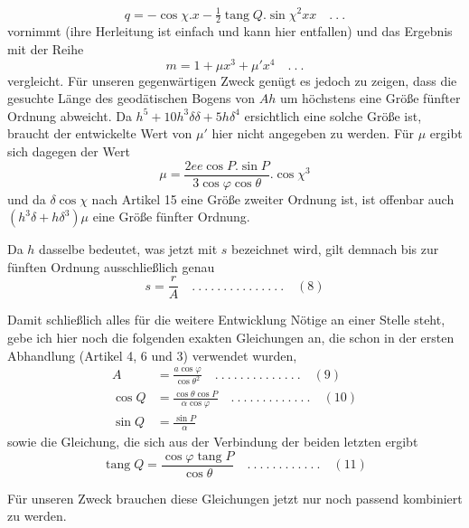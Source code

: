 \[
q=-\cos\chi\mathord{.}x-\tfrac12\operatorname{tang}Q\mathord{.}\sin\chi^2xx\quad .\ .\ .
\]
vornimmt (ihre Herleitung ist einfach und kann hier entfallen) und das Ergebnis mit der Reihe
\[
m=1+\mu x^3+\mu'x^4\quad .\ .\ .
\]
vergleicht. Für unseren gegenwärtigen Zweck genügt es jedoch zu zeigen, dass die gesuchte Länge des geodätischen Bogens von \(Ah\) um höchstens eine Größe fünfter Ordnung abweicht. Da \(h^5+10h^3\delta\delta+5h\delta^4\) ersichtlich eine solche Größe ist, braucht der entwickelte Wert von \(\mu'\) hier nicht angegeben zu werden. Für \(\mu\) ergibt sich dagegen der Wert
\[
\mu=\frac{2ee\cos P\mathord{.}\sin P}{3\cos\varphi\cos\theta}\mathord{.}\cos\chi^3
\]
und da \(\delta\cos\chi\) nach Artikel 15 eine Größe zweiter Ordnung ist, ist offenbar auch \((h^3\delta+h\delta^3)\mu\) eine Größe fünfter Ordnung.

Da \(h\) dasselbe bedeutet, was jetzt mit \(s\) bezeichnet wird, gilt demnach bis zur fünften Ordnung ausschließlich genau
\[
s=\frac rA\quad .\ .\ .\ .\ .\ .\ .\ .\ .\ .\ .\ .\ .\ .\ .\quad(8)
\]

\indent Damit schließlich alles für die weitere Entwicklung Nötige an einer Stelle steht, gebe ich hier noch die folgenden exakten Gleichungen an, die schon in der ersten Abhandlung (Artikel 4, 6 und 3) verwendet wurden,
\[
\begin{aligned}
A&=\frac{a\cos\varphi}{\cos\theta^2}\quad .\ .\ .\ .\ .\ .\ .\ .\ .\ .\ .\ .\ .\ .\quad(9)\\
\cos Q&=\frac{\cos\theta\cos P}{\alpha\cos\varphi}\quad .\ .\ .\ .\ .\ .\ .\ .\ .\ .\ .\ .\ .\quad(10)\\
\sin Q&=\frac{\sin P}{\alpha}
\end{aligned}
\]
sowie die Gleichung, die sich aus der Verbindung der beiden letzten ergibt
\[
\operatorname{tang}Q=\frac{\cos\varphi\operatorname{tang}P}{\cos\theta}\quad .\ .\ .\ .\ .\ .\ .\ .\ .\ .\ .\ .\quad(11)
\]

Für unseren Zweck brauchen diese Gleichungen jetzt nur noch passend kombiniert zu werden.
